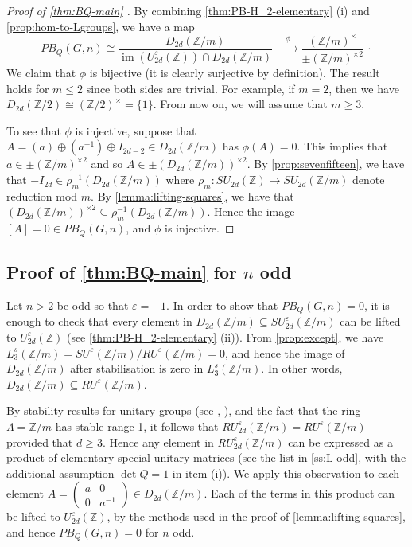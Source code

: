 \documentclass[11pt,a4paper,leqno]{amsart}
\theoremstyle{definition}
\theoremstyle{remark}
\newcommand{\cy}[1]{\Z/{#1}}
\newcommand{\Z}{\mathbb{Z}}
\DeclareMathOperator{\IM}{im}
\newcommand{\La}{\Lambda}
\newcommand{\bZ}{\mathbb Z}
\newcommand{\ep}{\varepsilon}
\newcommand{\SU}{SU^{\varepsilon}}
\newcommand{\RU}{RU^{\varepsilon}}
\newcommand{\U}{U^{\varepsilon}}
\begin{document}
\begin{proof}[Proof of \cref{thm:BQ-main} {}]
By combining \cref{thm:PB-H_2-elementary} (i) and \cref{prop:hom-to-Lgroups}, we have a map
\[ PB_Q(G,n) \cong \frac{D_{2d}(\Z/m)}{\IM(U_{2d}^\varepsilon(\Z)) \cap D_{2d}(\Z/m)} 
\xrightarrow{\ \quad \phi\quad } \frac{(\Z/m)^\times}{\pm (\cy m)^{\times 2}}\,\cdot \]
We claim that $\phi$ is bijective (it is clearly surjective by definition).
The result holds for $m \le 2$ since both sides are trivial. For example, if $m =2$, then we have $D_{2d}(\Z/2) \cong (\Z/2)^{\times} = \{1\}$. From now on, we will assume that $m \ge 3$. 

To see that $\phi$ is injective, suppose that $A=(a) \oplus (a^{-1}) \oplus I_{2d-2} \in D_{2d}(\Z/m)$ has $\phi(A) = 0$. This implies that $a\in \pm (\cy m)^{\times 2}$ and so $A \in \pm (D_{2d}(\Z/m))^{\times 2}$. By \cref{prop:sevenfifteen}, we have that $-I_{2d} \in \rho_m^{-1}(D_{2d}(\Z/m))$ where $\rho_m\colon  SU_{2d}(\Z) \to SU_{2d}(\Z/m)$ denote reduction mod $m$. By \cref{lemma:lifting-squares}, we have that $(D_{2d}(\Z/m))^{\times 2} \subseteq \rho_m^{-1}(D_{2d}(\Z/m))$. Hence the image $[A] = 0 \in PB_Q(G,n)$, and $\phi$ is injective.
\end{proof}

\subsection{Proof of \cref{thm:BQ-main} for $n$ odd} \label{ss:proof-n-odd}

Let $n > 2$ be odd so that $\ep = -1$. In order to show that $PB_Q(G,n)=0$, it is enough to check that every element in $D_{2d}(\Z/m)\subseteq \SU_{2d}(\cy m)$ can be lifted to $\U_{2d}(\bZ)$ (see \cref{thm:PB-H_2-elementary} (ii)).
From  \cref{prop:except}, we have $L_3^s(\cy m)=\SU(\cy m)/\RU(\cy m) =0$, and hence the image of 
$D_{2d}(\Z/m)$ after stabilisation is zero in $L_3^s(\cy m)$. 
In other words, $D_{2d}(\Z/m) \subseteq  \RU(\cy m)$.

By stability results for unitary groups (see \cite{Bak:2003}, \cite[Chapter VI]{Knus:1991}), and the fact that the ring $\La = \cy m$ has stable range 1, it follows that $RU_{2d}^\ep(\cy m) = \RU(\cy m)$ provided  that $d \geq 3$. Hence any element in $RU_{2d}^\ep(\cy m)$ can be expressed as a product of elementary special unitary matrices (see the list in \cref{ss:L-odd}, with the additional assumption $\det Q = 1$ in item (i)).  We apply this observation to each  element $A = \left(\begin{smallmatrix}a & 0 \\ 0 & a^{-1} \end{smallmatrix}\right) \in D_{2d}(\Z/m)$. Each of the terms in this product can be lifted to $\U_{2d}(\bZ)$, by the methods used in the proof of \cref{lemma:lifting-squares}, and hence $PB_Q(G,n) = 0$ for $n$ odd. 
\end{document}
